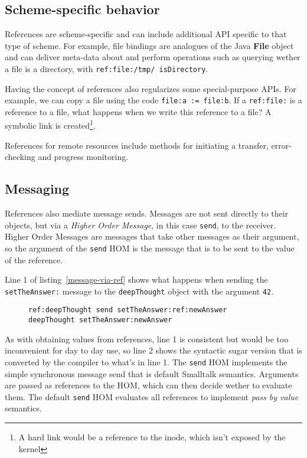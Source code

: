 \documentclass[preprint,authoryear]{llncs}
\begin{document}
\subsection{Scheme-specific behavior}

References are scheme-specific and can include additional API specific to that type of scheme.
For example, file bindings are analogues of the Java {\bf File} object and can deliver
meta-data about and perform operations such as querying wether a file is a directory, with
{\tt ref:file:/tmp/ isDirectory}.


Having the concept of references also regularizes some special-purpose APIs.  For example,
we can copy a file using the code {\tt file:a := file:b}.  If a {\tt ref:file:} is a reference to a file, what
happens when we write this reference to a file?  A symbolic link is created\footnote{A hard link
would be a reference to the inode, which isn't exposed by the kernel}.

References for remote resources include methods for initiating a transfer,
error-checking and progress monitoring.  

\subsection{Messaging}

References also mediate message sends.   Messages are not sent directly to their objects, but via a
\emph{Higher Order Message}\cite{HOM}, in this case {\tt send}, to the receiver.    Higher Order Messages
are messages that take other messages as their argument, so the argument of the {\tt send} HOM is the
message that is to be sent to the value of the reference.  

  Line 1 of listing~\ref{message-via-ref} shows
what happens when sending the {\tt setTheAnswer:} message to the {\tt deepThought} object with
the argument {\tt 42}.

\begin{figure}[htbp]
\begin{lstlisting}[style=numbers,label=message-via-ref,caption=Message sending via reference and with syntactic sugar]
ref:deepThought send setTheAnswer:ref:newAnswer
deepThought setTheAnswer:newAnswer
\end{lstlisting}
\end{figure}

As with obtaining values from references, line 1 is consistent but would be too inconvenient for day to day use,
so line 2 shows the syntactic sugar version that is converted by the compiler to what's in line 1.  The {\tt send}
HOM implements the simple synchronous message send that is default Smalltalk semantics.   Arguments
are passed as references to the HOM, which can then decide wether to evaluate them.  The default {\tt send}
HOM evaluates all references to implement \emph{pass by value} semantics.
\end{document}
